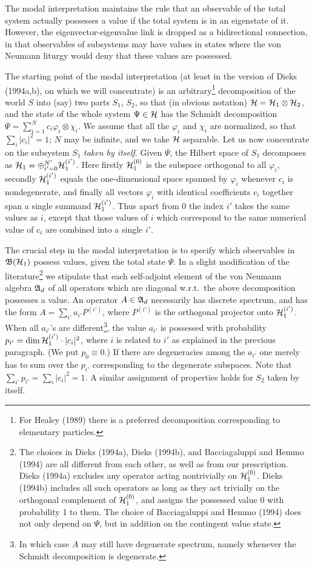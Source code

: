 \documentclass[12pt,titlepage]{article}
\newcommand{\phv}{\varphi}
\newcommand{\A}{\frak A}
\newcommand{\B}{\frak B}
\renewcommand{\H}{\mbox{$\cal H$}}
\newcommand{\fn}{\footnote}
\newcommand{\ot}{\otimes}
\begin{document}
 The modal interpretation maintains the rule that an  observable of the total
system actually
possesses a value if the total  system is in an eigenstate of it. However, the
eigenvector-eigenvalue
link is  dropped as a bidirectional connection, in that observables of
subsystems may have values in
states where the von Neumann liturgy would deny that these values are
possessed.

The starting point of the modal interpretation (at least in the version of
Dieks (1994a,b), on
which we will concentrate) is an arbitrary\fn{For Healey (1989) there is a
preferred decomposition
corresponding to elementary particles.}  decomposition of the world $S$ into
(say) two parts $S_1,\,
S_2$, so that (in obvious notation) $\H=\H_1\ot \H_2$, and the state of the
whole system $\Psi\in\H$
has the Schmidt decomposition $\Psi=\sum_{i=1}^N c_i \phv_i\ot \chi_i$.
We assume that all the $\phv_i$ and $\chi_i$ are normalized, so that
$\sum_i|c_i|^2=1$; $N$ may be
infinite, and  we take $\H$  separable. Let us now concentrate on the subsystem
$S_1$ {\em taken by
itself}.
 Given $\Psi$,
the Hilbert space of $S_1$ decomposes as $\H_1=\oplus_{i'=0}^{N'} \H_1^{(i')}$.
Here firstly
$\H_1^{(0)}$ is the subspace orthogonal to all $\phv_i$, secondly $\H_1^{(i')}$
equals the one-dimensional space spanned by $\phv_i$  whenever $c_i$ is
nondegenerate, and finally
all
 vectors $\phv_i$ with identical coefficients $c_i$ together span a single
summand $\H_1^{(i')}$.
Thus apart from $0$ the index $i'$ takes the same values as $i$, except that
those values of $i$
which correspond to the same numerical value of $c_i$ are combined into a
single $i'$.

The crucial step in the modal interpretation is to specify which observables in
$\B(\H_1)$ possess
values, given the total state $\Psi$. In a slight modification of the
literature\fn{The choices in
Dieks (1994a), Dieks (1994b), and Bacciagaluppi and Hemmo (1994) are all
different from each other, as
well as from our prescription. Dieks (1994a) excludes any operator acting
nontrivially on
$\H_1^{(0)}$. Dieks (1994b) includes  all such operators as long as they act
trivially on the
orthogonal complement of $\H_1^{(0)}$, and assigns the possessed value 0 with
probability 1 to them.
The choice of Bacciagaluppi and Hemmo (1994) does not only depend on $\Psi$,
but in addition on the
contingent value state.} we stipulate that each self-adjoint element of the von
Neumann algebra $\A_d$
of all  operators which are diagonal w.r.t.\ the above decomposition  possesses
a value.
An operator $A\in\A_d$ necessarily has discrete spectrum, and has the form
$A=\sum_{i'}a_{i'}P^{(i')}$,
where  $P^{(i')}$ is the orthogonal projector onto   $\H_1^{(i')}$. When all
$a_{i'}$'s are
different\fn{In which case $A$ may still have degenerate spectrum, namely
whenever the Schmidt
decomposition is degenerate.}, the value $a_{i'}$ is possessed with probability
$p_{i'}={\rm dim}\,
\H_1^{(i')} \cdot |c_i|^2$, where $i$ is related to $i'$ as explained in the
previous paragraph. (We
put $p_0\equiv 0$.) If there are degeneracies among the $a_{i'}$  one merely
has to sum over the
$p_{i'}$ corresponding to the degenerate subspaces. Note that
$\sum_{i'}p_{i'}=\sum_i|c_i|^2=1$.
  A similar
assignment of properties holds for $S_2$ taken by itself.
\end{document}
